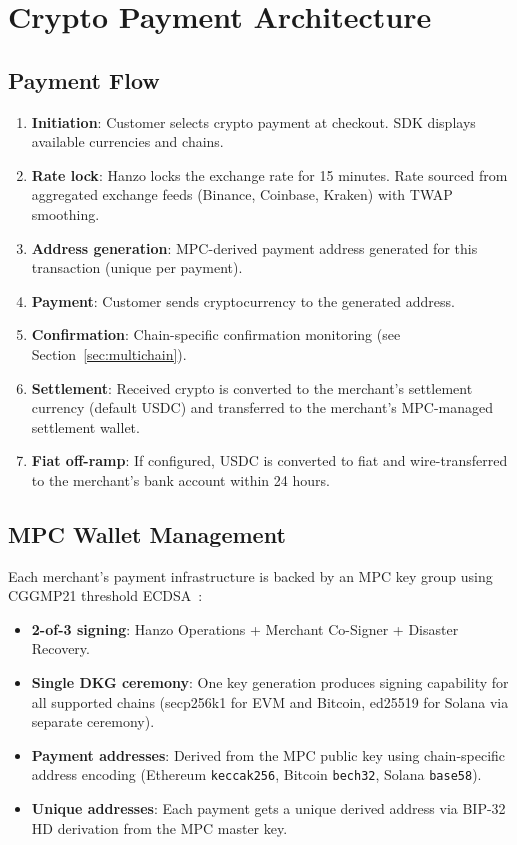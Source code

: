 \section{Crypto Payment Architecture}

\label{sec:architecture}

\subsection{Payment Flow}

\begin{enumerate}[leftmargin=1.4em]
    \item \textbf{Initiation}: Customer selects crypto payment at
    checkout. SDK displays available currencies and chains.
    \item \textbf{Rate lock}: Hanzo locks the exchange rate for 15
    minutes. Rate sourced from aggregated exchange feeds (Binance,
    Coinbase, Kraken) with TWAP smoothing.
    \item \textbf{Address generation}: MPC-derived payment address
    generated for this transaction (unique per payment).
    \item \textbf{Payment}: Customer sends cryptocurrency to the
    generated address.
    \item \textbf{Confirmation}: Chain-specific confirmation monitoring
    (see Section~\ref{sec:multichain}).
    \item \textbf{Settlement}: Received crypto is converted to the
    merchant's settlement currency (default USDC) and transferred to
    the merchant's MPC-managed settlement wallet.
    \item \textbf{Fiat off-ramp}: If configured, USDC is converted to
    fiat and wire-transferred to the merchant's bank account within 24
    hours.
\end{enumerate}

\subsection{MPC Wallet Management}

Each merchant's payment infrastructure is backed by an MPC key group
using CGGMP21 threshold ECDSA~\cite{cggmp21}:

\begin{itemize}[leftmargin=1.4em]
    \item \textbf{2-of-3 signing}: Hanzo Operations + Merchant Co-Signer
    + Disaster Recovery.
    \item \textbf{Single DKG ceremony}: One key generation produces
    signing capability for all supported chains (secp256k1 for EVM and
    Bitcoin, ed25519 for Solana via separate ceremony).
    \item \textbf{Payment addresses}: Derived from the MPC public key
    using chain-specific address encoding (Ethereum \texttt{keccak256},
    Bitcoin \texttt{bech32}, Solana \texttt{base58}).
    \item \textbf{Unique addresses}: Each payment gets a unique derived
    address via BIP-32 HD derivation from the MPC master key.
\end{itemize}

